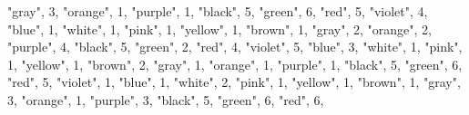 \documentclass[
]{article}
\newenvironment{Shaded}{\begin{snugshade}}{\end{snugshade}}
\newcommand{\DecValTok}[1]{\textcolor[rgb]{0.00,0.00,0.81}{#1}}
\newcommand{\NormalTok}[1]{#1}
\newcommand{\StringTok}[1]{\textcolor[rgb]{0.31,0.60,0.02}{#1}}
\begin{document}
\begin{Shaded}
\begin{Highlighting}[]
  \StringTok{"gray"}\NormalTok{, }\DecValTok{3}\NormalTok{,}
  \StringTok{"orange"}\NormalTok{, }\DecValTok{1}\NormalTok{,}
  \StringTok{"purple"}\NormalTok{, }\DecValTok{1}\NormalTok{,}
    \StringTok{"black"}\NormalTok{, }\DecValTok{5}\NormalTok{,}
  \StringTok{"green"}\NormalTok{, }\DecValTok{6}\NormalTok{,}
  \StringTok{"red"}\NormalTok{, }\DecValTok{5}\NormalTok{,}
  \StringTok{"violet"}\NormalTok{, }\DecValTok{4}\NormalTok{,}
  \StringTok{"blue"}\NormalTok{, }\DecValTok{1}\NormalTok{,}
  \StringTok{"white"}\NormalTok{, }\DecValTok{1}\NormalTok{,}
  \StringTok{"pink"}\NormalTok{, }\DecValTok{1}\NormalTok{,}
  \StringTok{"yellow"}\NormalTok{, }\DecValTok{1}\NormalTok{,}
  \StringTok{"brown"}\NormalTok{, }\DecValTok{1}\NormalTok{,}
  \StringTok{"gray"}\NormalTok{, }\DecValTok{2}\NormalTok{,}
  \StringTok{"orange"}\NormalTok{, }\DecValTok{2}\NormalTok{, }
  \StringTok{"purple"}\NormalTok{, }\DecValTok{4}\NormalTok{,}
    \StringTok{"black"}\NormalTok{, }\DecValTok{5}\NormalTok{,}
  \StringTok{"green"}\NormalTok{, }\DecValTok{2}\NormalTok{,}
  \StringTok{"red"}\NormalTok{, }\DecValTok{4}\NormalTok{,}
  \StringTok{"violet"}\NormalTok{, }\DecValTok{5}\NormalTok{,}
  \StringTok{"blue"}\NormalTok{, }\DecValTok{3}\NormalTok{,}
  \StringTok{"white"}\NormalTok{, }\DecValTok{1}\NormalTok{,}
  \StringTok{"pink"}\NormalTok{, }\DecValTok{1}\NormalTok{,}
  \StringTok{"yellow"}\NormalTok{, }\DecValTok{1}\NormalTok{,}
  \StringTok{"brown"}\NormalTok{, }\DecValTok{2}\NormalTok{,}
  \StringTok{"gray"}\NormalTok{, }\DecValTok{1}\NormalTok{,}
  \StringTok{"orange"}\NormalTok{, }\DecValTok{1}\NormalTok{,}
  \StringTok{"purple"}\NormalTok{, }\DecValTok{1}\NormalTok{,}
    \StringTok{"black"}\NormalTok{, }\DecValTok{5}\NormalTok{,}
  \StringTok{"green"}\NormalTok{, }\DecValTok{6}\NormalTok{,}
  \StringTok{"red"}\NormalTok{, }\DecValTok{5}\NormalTok{,}
  \StringTok{"violet"}\NormalTok{, }\DecValTok{1}\NormalTok{,}
  \StringTok{"blue"}\NormalTok{, }\DecValTok{1}\NormalTok{,}
  \StringTok{"white"}\NormalTok{, }\DecValTok{2}\NormalTok{,}
  \StringTok{"pink"}\NormalTok{, }\DecValTok{1}\NormalTok{,}
  \StringTok{"yellow"}\NormalTok{, }\DecValTok{1}\NormalTok{,}
  \StringTok{"brown"}\NormalTok{, }\DecValTok{1}\NormalTok{,}
  \StringTok{"gray"}\NormalTok{, }\DecValTok{3}\NormalTok{,}
  \StringTok{"orange"}\NormalTok{, }\DecValTok{1}\NormalTok{,}
  \StringTok{"purple"}\NormalTok{, }\DecValTok{3}\NormalTok{,}
    \StringTok{"black"}\NormalTok{, }\DecValTok{5}\NormalTok{,}
  \StringTok{"green"}\NormalTok{, }\DecValTok{6}\NormalTok{,}
  \StringTok{"red"}\NormalTok{, }\DecValTok{6}\NormalTok{,}

\end{Highlighting}
\end{Shaded}
\end{document}
